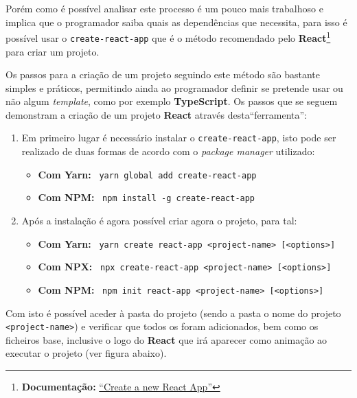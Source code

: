 Porém como é possível analisar este processo é um pouco mais trabalhoso e implica que o programador saiba quais as dependências que necessita, para isso é possível usar o \texttt{create-react-app} que é o método recomendado pelo \textbf{React}\footnote{\textbf{Documentação:} \href{https://reactjs.org/docs/create-a-new-react-app.html}{``Create a new React App''}} para criar um projeto.

Os passos para a criação de um projeto seguindo este método são bastante simples e práticos, permitindo ainda ao programador definir se pretende usar ou não algum \textit{template}, como por exemplo \textbf{TypeScript}. Os passos que se seguem demonstram a criação de um projeto \textbf{React} através desta``ferramenta'':

\begin{enumerate}
	\item Em primeiro lugar é necessário instalar o \texttt{create-react-app}, isto pode ser realizado de duas formas de acordo com o \textit{package manager} utilizado:
	\begin{itemize}
		\item \textbf{Com Yarn:} ~\texttt{yarn global add create-react-app}
		\item \textbf{Com NPM:} ~\texttt{npm install -g create-react-app}
	\end{itemize}
	\item Após a instalação é agora possível criar agora o projeto, para tal:
	\begin{itemize}
		\item \textbf{Com Yarn:} ~\texttt{yarn create react-app <project-name> [<options>]}
		\item \textbf{Com NPX:} ~\texttt{npx create-react-app <project-name> [<options>]}
		\item \textbf{Com NPM:} ~\texttt{npm init react-app <project-name> [<options>]}
	\end{itemize}
\end{enumerate}

Com isto é possível aceder à pasta do projeto (sendo a pasta o nome do projeto \textemdash~ \texttt{<project-name>}) e verificar que todos os \textit{\underline{}} foram adicionados, bem como os ficheiros base, inclusive o logo do \textbf{React} que irá aparecer como animação ao executar o projeto {\scriptsize (ver figura abaixo)}.


